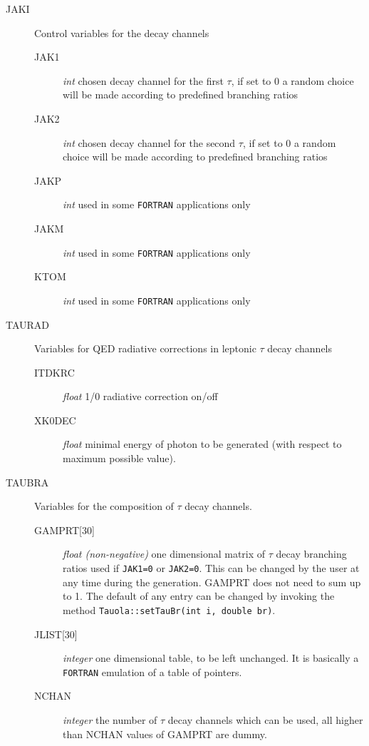 \documentclass[]{Tauola_interface_design}
\begin{document}
\begin{description}
\item[JAKI] Control variables for the decay channels
  \begin{description}
  \item[JAK1] \textit{int} chosen decay channel for the first $\tau$, if set to $0$
a random choice will be made according to predefined branching ratios
  \item[JAK2] \textit{int}
chosen decay channel for the second $\tau$, if set to $0$
a random choice will be made according to predefined branching ratios
  \item[JAKP] \textit{int} used in some {\tt FORTRAN} applications only
  \item[JAKM] \textit{int} used in some  {\tt FORTRAN} applications only
  \item[KTOM] \textit{int} used in some  {\tt FORTRAN} applications only
  \end{description}
\end{description}  

\begin{description}
\item[TAURAD] Variables for QED radiative corrections in leptonic $\tau$ decay channels
    \begin{description}
      \item[ITDKRC] \textit{float} 1/0 radiative correction on/off
      \item[XK0DEC] \textit{float} minimal energy of photon to be generated
(with respect to maximum possible value).
  \end{description}
\end{description}  

\begin{description}
\item[TAUBRA] Variables for the composition of $\tau$ decay channels. 
    \begin{description}
      \item[{GAMPRT[30]} ] \textit{float (non-negative)} one dimensional matrix of $\tau$ decay branching ratios used if {\tt JAK1=0} or {\tt JAK2=0}. This can be changed by the user at any time during the generation. GAMPRT does not need to sum up to 1. The default of any entry can be changed by invoking 
the method  {\tt Tauola::setTauBr(int i, double br)}. 

      \item[{JLIST[30]} ] \textit{integer} one  dimensional table, to be left unchanged. It is basically a  {\tt FORTRAN} emulation of a table of pointers.
      \item[NCHAN] \textit{integer} the number of $\tau$ decay channels which can be used, all higher than NCHAN values of GAMPRT are dummy.  
  \end{description}
\end{description}  
\end{document}
